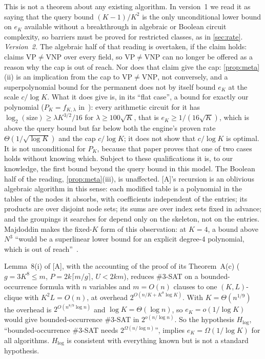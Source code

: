\documentclass[10pt]{amsart}
\theoremstyle{plain}
\theoremstyle{definition}
\theoremstyle{remark}
\numberwithin{equation}{section}
\newcommand{\A}{\textup{[A]}}
\begin{document}
\noindent This is not a theorem about any existing algorithm. In version~1 we read it as saying that
the query bound $(K-1)/K^2$ is the only unconditional lower bound on $e_K$ available without a
breakthrough in algebraic or Boolean circuit complexity, so barriers must be proved for restricted
classes, as in \cref{sec:rate}. \emph{Version~2.} The algebraic half of that reading is overtaken, if
the claim holds: \cite{AnthropicVP26} claims $\mathrm{VP}\ne\mathrm{VNP}$ over every field, so
$\mathrm{VP}\ne\mathrm{VNP}$ can no longer be offered as a reason why the cap is out of reach.
Nor does that claim give the cap: \cref{prop:meta}(ii) is an implication from the cap to
$\mathrm{VP}\ne\mathrm{VNP}$, not conversely, and a superpolynomial bound for the permanent does
not by itself bound $e_K$ at the scale $c/\log K$. What it does give is, in its ``flat case'', a bound for
exactly our polynomial ($P_K=f_{K,\lambda}$ in~\cite[\S2.3]{AnthropicVP26}): every arithmetic circuit
for it has $\log_2(\text{size})\ge\lambda K^{3/2}/16$ for $\lambda\ge100\sqrt K$, that is
$e_K\ge1/(16\sqrt K)$, which is above the query bound but far below both the engine's proven rate $\Theta(1/\sqrt{\log K})$ and the cap $c/\log K$; it does
not show that $c/\log K$ is optimal. It is not unconditional for $P_K$, because that paper proves
that one of two cases holds without knowing which. Subject to these qualifications it is, to our
knowledge, the first bound beyond the query bound in this model. The Boolean half of the reading,
\cref{prop:meta}(iii), is unaffected. \A's recursion is an oblivious algebraic algorithm in this sense: each modified table
is a polynomial in the tables of the nodes it absorbs, with coefficients independent of the entries;
its products are over disjoint node sets; its sums are over index sets fixed in advance; and the
groupings it searches for depend only on the skeleton, not on the entries. Majdoddin makes the
fixed-$K$ form of this observation: at $K=4$, a bound above $N^3$ ``would be a superlinear lower bound
for an explicit degree-4 polynomial, which is out of reach''~\cite[Remark~2.9]{Maj26}.

\begin{proposition}\label{prop:hlog}
Lemma~8(i) of \A, with the accounting of the proof of its Theorem~A(c) ($g=3K^8\le m$,
$P=2k\lceil m/g\rceil$, $U<2km$), reduces $\#3$-SAT on a bounded-occurrence formula with $n$ variables
and $m=O(n)$ clauses to one $(K,L)$-clique with $K^2L=O(n)$, at overhead $2^{O(n/K+K^8\log K)}$. With
$K=\Theta(n^{1/9})$ the overhead is $2^{O(n^{8/9}\log n)}$ and $\log K=\Theta(\log n)$, so
$e_K=o(1/\log K)$ would give bounded-occurrence $\#3$-SAT in $2^{o(n/\log n)}$. So the hypothesis
$H_{\log}$, ``bounded-occurrence $\#3$-SAT needs $2^{\Omega(n/\log n)}$'', implies $e_K=\Omega(1/\log K)$
for all algorithms. $H_{\log}$ is consistent with everything known but is not a standard hypothesis.
\end{proposition}
\end{document}
